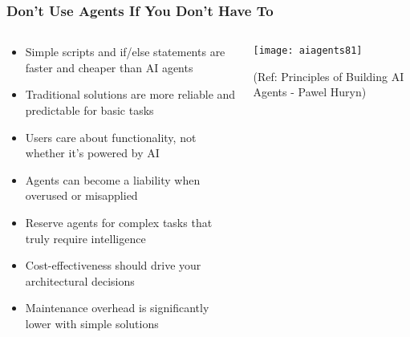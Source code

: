 \begin{frame}[fragile]\frametitle{Don't Use Agents If You Don't Have To}
\begin{columns}
    \begin{column}[T]{0.6\linewidth}
      \begin{itemize}
		\item Simple scripts and if/else statements are faster and cheaper than AI agents
		\item Traditional solutions are more reliable and predictable for basic tasks
		\item Users care about functionality, not whether it's powered by AI
		\item Agents can become a liability when overused or misapplied
		\item Reserve agents for complex tasks that truly require intelligence
		\item Cost-effectiveness should drive your architectural decisions
		\item Maintenance overhead is significantly lower with simple solutions
	  \end{itemize}
    \end{column}
    \begin{column}[T]{0.4\linewidth}
		\begin{center}
		\texttt{[image: aiagents81]}
		
		{\tiny (Ref: Principles of Building AI Agents - Pawel Huryn)}
		\end{center}	
    \end{column}
  \end{columns}
\end{frame}

